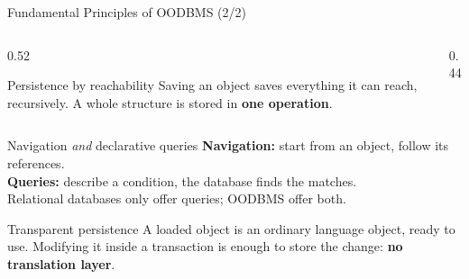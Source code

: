 \documentclass{beamer}
\begin{document}
\begin{frame}{Fundamental Principles of OODBMS (2/2)}
    \small
    \begin{columns}[c]
        \begin{column}{0.52\textwidth}
            \begin{block}{Persistence by reachability}
                Saving an object saves everything it can reach, recursively.
                A whole structure is stored in \textbf{one operation}.
            \end{block}
        \end{column}
        \begin{column}{0.44\textwidth}
            \centering
        \end{column}
    \end{columns}

    \vspace{0.1em}
    \begin{block}{Navigation \emph{and} declarative queries}
        \textbf{Navigation:} start from an object, follow its references.\\
        \textbf{Queries:} describe a condition, the database finds the matches.\\
        Relational databases only offer queries; OODBMS offer both.
    \end{block}

    \begin{block}{Transparent persistence}
        A loaded object is an ordinary language object, ready to use. Modifying it inside a
        transaction is enough to store the change: \textbf{no translation layer}.
    \end{block}
\end{frame}
\end{document}
